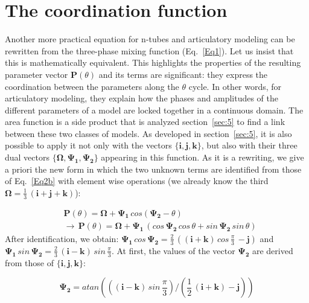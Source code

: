 \documentclass[10pt,twocolumn]{article}
\newcommand{\linenomath}{}                 %
\begin{document}
\section{\label{sec:4} The coordination function}
Another more practical equation for n-tubes and articulatory modeling can be rewritten from the three-phase mixing function (Eq.~\ref{Eq1}). Let us insist that this is mathematically equivalent. This highlights the properties of the resulting parameter vector $\bm{P}(\theta)$ and its terms are significant: they express the coordination between the parameters along the $\theta$ cycle. In other words, for articulatory modeling, they explain how the phases and amplitudes of the different parameters of a model are locked together in a continuous domain. The area function is a side product that is analyzed section~\ref{sec:5} to find a link between these two classes of models. As developed in section~\ref{sec:5}, it is also possible to apply it not only with the vectors $\{\bm{i},\bm{j}, \bm{k}\}$, but also with their three dual vectors $\{\bm{\Omega},\bm{\Psi_1},\bm{\Psi_2}\}$ appearing in this function. As it is a rewriting, we give a priori the new form in which the two unknown terms are identified from those of Eq.~\ref{Eq2b} with element wise operations (we already know the third $\bm{\Omega}=\tfrac {1}{3}\,(\bm{i}+\bm{j}+\bm{k})$):
\linenomath
\begin{subequations}
\begin{align}
&\bm{P}(\theta) = \bm{\Omega} + \bm{\Psi_1}\, cos(\bm{\Psi_2} - \theta) \label{eq5a} \\
&\rightarrow \, \bm{P}(\theta) = \bm{\Omega} + \bm{\Psi_1}\,(cos\,\bm{\Psi_2} \,cos\,\theta + sin\,\bm{\Psi_2} \,sin\,\theta) \label{eq5b}
\end{align}
\end{subequations}
After identification, we obtain:
$\bm{\Psi_1}\, cos\,\bm{\Psi_2}=\tfrac {2}{3} \,((\bm{i}+\bm{k})\,cos\,\tfrac{\pi}{3}\, -  \bm{j})$ and $\bm{\Psi_1}\, sin\,\bm{\Psi_2}=\tfrac {2}{3} \,(\bm{i}-\bm{k}) \,sin\,\tfrac{\pi}{3}$. At first, the values of the vector $\bm{\Psi_2}$ are derived from those of $\{\bm{i},\bm{j}, \bm{k}\}$:
\linenomath
\begin{equation}
\bm{\Psi_2}=atan(((\bm{i}-\bm{k}) \,sin\,\frac{\pi}{3})/(\frac{1}{2}\,(\bm{i}+\bm{k})-\bm{j}))\label{Eq6}
\end{equation}
\end{document}
